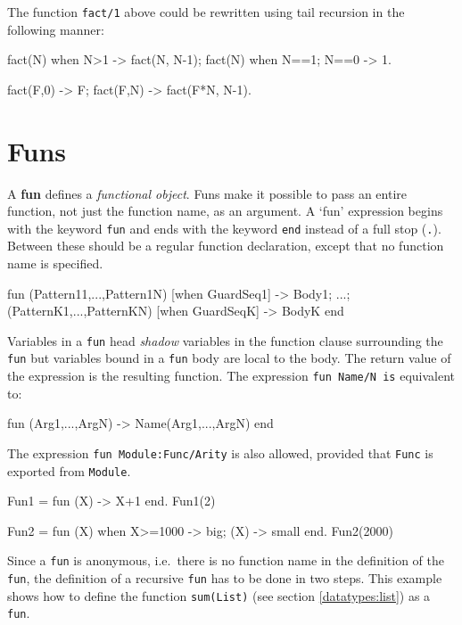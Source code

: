 The function \texttt{fact/1} above could be rewritten using tail
recursion in the following manner:

 \begin{erlang}
fact(N) when N>1 -> fact(N, N-1);
fact(N) when N==1; N==0 -> 1.

fact(F,0) -> F;                 %
fact(F,N) -> fact(F*N, N-1).
\end{erlang}


\section{Funs}
\label{functions:funs}
A \textbf{fun} defines a \textit{functional object}. Funs make it
possible to pass an entire function, not just the function name, as an
argument. A `fun' expression begins with the keyword \texttt{fun} and
ends with the keyword \texttt{end} instead of a full stop
(\texttt{.}).  Between these should be a regular function
declaration, except that no function name is specified.

\begin{erlang}
fun
    (Pattern11,...,Pattern1N) [when GuardSeq1] ->
        Body1;
        ...;
    (PatternK1,...,PatternKN) [when GuardSeqK] ->
        BodyK
end
\end{erlang}

Variables in a \texttt{fun} head \textit{shadow} variables in the function
clause surrounding the \texttt{fun} but variables bound in a \texttt{fun} body are local
to the body.  The return value of the expression is the resulting function. The expression
\texttt{fun Name/N is} equivalent to:

\begin{erlang}
fun (Arg1,...,ArgN) -> Name(Arg1,...,ArgN) end
\end{erlang}

The expression \texttt{fun Module:Func/Arity} is also allowed, provided that \texttt{Func} is exported
from \texttt{Module}.

\begin{erlang}
Fun1 = fun (X) -> X+1 end.
Fun1(2)         %

Fun2 = fun (X) when X>=1000 -> big; (X) -> small end.
Fun2(2000)      %
\end{erlang}

Since a \texttt{fun} is anonymous, i.e.~there is no function name in the
definition of the \texttt{fun}, the definition of a recursive \texttt{fun} has to be
done in two steps.  This example shows how to define the function
\texttt{sum(List)} (see section \ref{datatypes:list}) as a \texttt{fun}.

